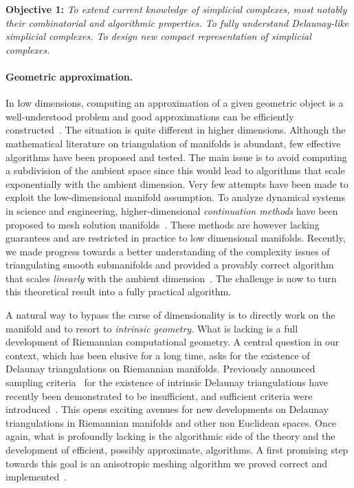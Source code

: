 {\bf Objective 1:} {\em 
To extend  current knowledge of simplicial complexes, most notably their combinatorial and algorithmic properties.   To fully understand Delaunay-like simplicial complexes.  To design new  compact representation of simplicial complexes.}

\paragraph{Geometric approximation.}
In low dimensions, computing an approximation of a given geometric
object is a well-understood problem and good approximations can be
efficiently constructed~\cite{geometrica-bcmrv-ms-06,he-gtmg-2001}.
The situation is quite different in higher dimensions.  Although the
mathematical literature on triangulation of manifolds is abundant, few
effective algorithms have been proposed and tested.  The main issue is
to avoid computing a subdivision of the ambient space since this would lead to algorithms that scale exponentially with the ambient dimension. Very few attempts have been made to exploit the  low-dimensional manifold assumption.
To analyze {dynamical systems} in science and engineering, higher-dimensional {\em continuation methods} have been proposed to mesh solution manifolds~\cite{mh-mpc-2002}. These methods are however lacking guarantees and are restricted in practice to low dimensional manifolds. 
Recently, we made progress towards a better understanding of the complexity issues of triangulating smooth submanifolds and provided a provably correct algorithm that scales {\em linearly} with the ambient dimension~\cite{boissonnat2010meshing}. 
The challenge is now to turn this theoretical result into a fully practical algorithm.

A natural way to bypass the curse of dimensionality is to directly
work on the manifold and to resort to {\em intrinsic geometry}. What
is lacking is a full development of Riemannian computational
geometry. A central question in our context, which has been elusive
for a long time, asks for the existence of Delaunay triangulations on
Riemannian manifolds. Previously announced sampling
criteria~\cite{leibon2000} for the existence of intrinsic Delaunay
triangulations have recently been demonstrated to be insufficient, and
sufficient criteria were introduced~\cite{boissonnat2012stab}. This opens exciting avenues for new developments on Delaunay triangulations in Riemannian manifolds and other non Euclidean spaces. Once again, what is profoundly lacking is the algorithmic side of the theory and the development of efficient, possibly approximate, algorithms.  A first promising step towards this goal is an anisotropic meshing algorithm we proved correct and implemented~\cite{bwy-luam-08}.


